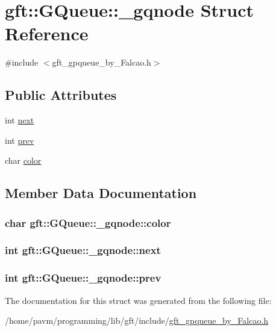 \hypertarget{structgft_1_1GQueue_1_1__gqnode}{\section{gft\-:\-:G\-Queue\-:\-:\-\_\-gqnode Struct Reference}
\label{structgft_1_1GQueue_1_1__gqnode}
}


{\ttfamily \#include $<$gft\-\_\-gpqueue\-\_\-by\-\_\-\-Falcao.\-h$>$}

\subsection*{Public Attributes}
\begin{DoxyCompactItemize}
\item 
int \hyperlink{structgft_1_1GQueue_1_1__gqnode_af76b46451ec6934dbb4a9d04070e86ce}{next}
\item 
int \hyperlink{structgft_1_1GQueue_1_1__gqnode_ab9f8ff22b56ce8c4b8aeedec3d87046b}{prev}
\item 
char \hyperlink{structgft_1_1GQueue_1_1__gqnode_aec38d39d460c53a928750aa6e1cb1fa8}{color}
\end{DoxyCompactItemize}


\subsection{Member Data Documentation}
\hypertarget{structgft_1_1GQueue_1_1__gqnode_aec38d39d460c53a928750aa6e1cb1fa8}{
\subsubsection[{color}]{\setlength{\rightskip}{0pt plus 5cm}char gft\-::\-G\-Queue\-::\-\_\-gqnode\-::color}}\label{structgft_1_1GQueue_1_1__gqnode_aec38d39d460c53a928750aa6e1cb1fa8}
\hypertarget{structgft_1_1GQueue_1_1__gqnode_af76b46451ec6934dbb4a9d04070e86ce}{
\subsubsection[{next}]{\setlength{\rightskip}{0pt plus 5cm}int gft\-::\-G\-Queue\-::\-\_\-gqnode\-::next}}\label{structgft_1_1GQueue_1_1__gqnode_af76b46451ec6934dbb4a9d04070e86ce}
\hypertarget{structgft_1_1GQueue_1_1__gqnode_ab9f8ff22b56ce8c4b8aeedec3d87046b}{
\subsubsection[{prev}]{\setlength{\rightskip}{0pt plus 5cm}int gft\-::\-G\-Queue\-::\-\_\-gqnode\-::prev}}\label{structgft_1_1GQueue_1_1__gqnode_ab9f8ff22b56ce8c4b8aeedec3d87046b}


The documentation for this struct was generated from the following file\-:\begin{DoxyCompactItemize}
\item 
/home/pavm/programming/lib/gft/include/\hyperlink{gft__gpqueue__by__Falcao_8h}{gft\-\_\-gpqueue\-\_\-by\-\_\-\-Falcao.\-h}\end{DoxyCompactItemize}
